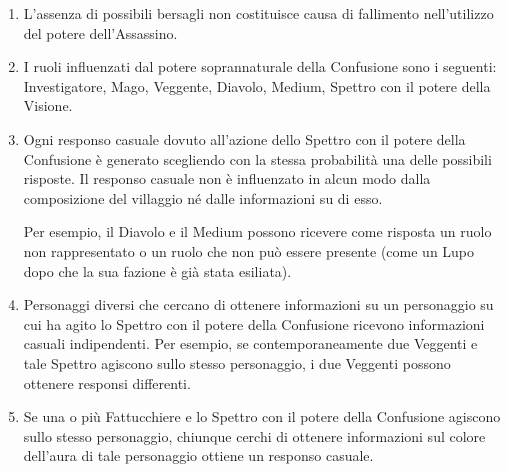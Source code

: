 \documentclass[a4paper,10pt]{article}
\begin{document}
\begin{enumerate}
 \item L'assenza di possibili bersagli non costituisce causa di fallimento nell'utilizzo del potere dell'Assassino.
 
 \item I ruoli influenzati dal potere soprannaturale della Confusione sono i seguenti: Investigatore, Mago, Veggente, Diavolo, Medium, Spettro con il potere della Visione.
 
 \item Ogni responso casuale dovuto all'azione dello Spettro con il potere della Confusione è generato scegliendo con la stessa probabilità una delle possibili risposte.
 Il responso casuale non è influenzato in alcun modo dalla composizione del villaggio né dalle informazioni su di esso.
 
 Per esempio, il Diavolo e il Medium possono ricevere come risposta un ruolo non rappresentato o un ruolo che non può essere presente (come un Lupo dopo che la sua fazione è già stata esiliata).
 
 \item Personaggi diversi che cercano di ottenere informazioni su un personaggio su cui ha agito lo Spettro con il potere della Confusione ricevono informazioni casuali indipendenti.
 Per esempio, se contemporaneamente due Veggenti e tale Spettro agiscono sullo stesso personaggio, i due Veggenti possono ottenere responsi differenti.
 
 \item Se una o più Fattucchiere e lo Spettro con il potere della Confusione agiscono sullo stesso personaggio, chiunque cerchi di ottenere informazioni sul colore dell'aura di tale personaggio ottiene un responso casuale.
 
%  
 

\end{enumerate}
\end{document}
